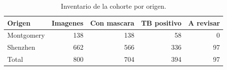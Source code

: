 \begin{table}[H]
\centering
\small
\caption{Inventario de la cohorte por origen.}
\begin{tabular}{lrrrr}
\toprule
\textbf{Origen} & \textbf{Imagenes} & \textbf{Con mascara} & \textbf{TB positivo} & \textbf{A revisar} \\
\midrule
Montgomery & 138 & 138 & 58 & 0 \\
Shenzhen & 662 & 566 & 336 & 97 \\
Total & 800 & 704 & 394 & 97 \\
\bottomrule
\end{tabular}
\end{table}
